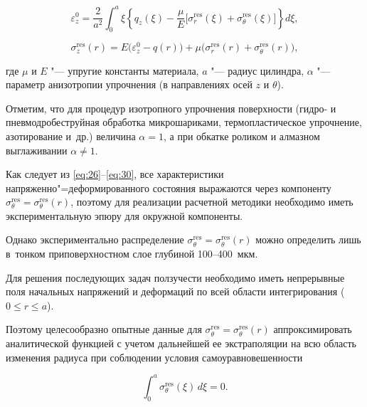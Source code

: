 \begin{equation}

\label{eq:30} \varepsilon _z^0  =  \frac{2}{a^2}\int_0^a \xi \left\{ q_z (\xi) - \frac{\mu}{E}\Big[ \sigma _r^{\text{res}}

(\xi) + \sigma_\theta ^{\text{res}} (\xi) \Big] \right\} d \xi,

\end{equation}

\begin{equation}

\label{eq:30} \sigma_z^{\text{res}} (r)  =  E \bigl (\varepsilon_z^0 - q (r) \bigr) + \mu \bigl (\sigma _r^{\text{res}} (r) +

\sigma_\theta ^{\text{res}} (r) \bigr),

\end{equation}

где $\mu$ и $E$ "--- упругие константы материала, $a$ "--- радиус цилиндра, $\alpha$ "--- параметр анизотропии упрочнения (в направлениях осей $z$ и $\theta$).

Отметим, что для процедур изотропного упрочнения поверхности (гидро- и пневмодробеструйная обработка микрошариками, термопластическое упрочнение, азотирование и~др.) величина $\alpha = 1$, а при обкатке роликом и алмазном выглаживании $\alpha \neq 1$.

Как следует из \eqref{eq:26}--\eqref{eq:30}, все характеристики напряженно"=деформированного состояния выражаются через компоненту $\sigma_\theta^{\text{res}} = \sigma_\theta^{\text{res}} (r)$, поэтому для реализации расчетной методики необходимо иметь экспериментальную эпюру для окружной компоненты.

Однако экспериментально распределение $\sigma_\theta^{\text{res}} = \sigma_\theta^{\text{res}} (r)$ можно определить лишь в~тонком приповерхностном слое глубиной 100--400~мкм.

Для решения последующих задач ползучести необходимо иметь непрерывные поля начальных напряжений и деформаций по всей области интегрирования ($0 \le r \le a$).

Поэтому целесообразно опытные данные для $\sigma_\theta^{\text{res}} = \sigma_\theta^{\text{res}} (r)$ аппроксимировать аналитической функцией с учетом дальнейшей ее экстраполяции на всю область изменения радиуса при соблюдении условия самоуравновешенности

\begin{equation*}



\int _{0}^{a} \sigma_\theta^{\text{res}}(\xi)\,d\xi=0.

\end{equation*}



